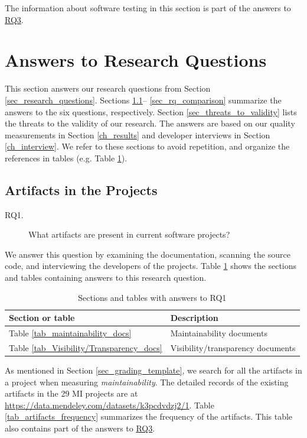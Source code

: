 \documentclass[3p, 12pt,authoryear]{elsarticle}
\begin{document}
The information about software testing in this section is part of the answers to
\hyperlink{rq3}{RQ3}.

\section{Answers to Research Questions} \label{ch_answers}

This section answers our research questions from Section
\ref{sec_research_questions}.  Sections \ref{sec_rq_artifacts}--
\ref{sec_rq_comparison} summarize the answers to the six questions,
respectively. Section \ref{sec_threats_to_validity} lists the threats to the
validity of our research. The answers are based on our quality measurements in
Section \ref{ch_results} and developer interviews in Section \ref{ch_interview}.
We refer to these sections to avoid repetition, and organize the references in
tables (e.g. Table \ref{tab_reference_rq1}).

\subsection{Artifacts in the Projects} \label{sec_rq_artifacts}
\begin{description}
\item[RQ1.] What artifacts are present in current software projects?
\end{description}

We answer this question by examining the documentation, scanning the source
code, and interviewing the developers of the projects. Table
\ref{tab_reference_rq1} shows the sections and tables containing answers to this
research question.

\begin{table}[ht]
\centering
\begin{tabular}{ll}
\hline
Section or table & Description \\ \hline
Table \ref{tab_maintainability_docs} & Maintainability documents \\
Table \ref{tab_Visibility/Transparency_docs} & Visibility/transparency documents \\ \hline
\end{tabular}
\caption{\label{tab_reference_rq1}Sections and tables with answers to RQ1}
\end{table}

As mentioned in Section \ref{sec_grading_template}, we search for all the
artifacts in a project when measuring \textit{maintainability}. The detailed
records of the existing artifacts in the 29 MI projects are at
\hyperlink{https://data.mendeley.com/datasets/k3pcdvdzj2/1}{https://data.mendeley.com/datasets/k3pcdvdzj2/1}.
Table \ref{tab_artifacts_frequency} summarizes the frequency of the artifacts.
This table also contains part of the answers to \hyperlink{rq3}{RQ3}.
\end{document}
